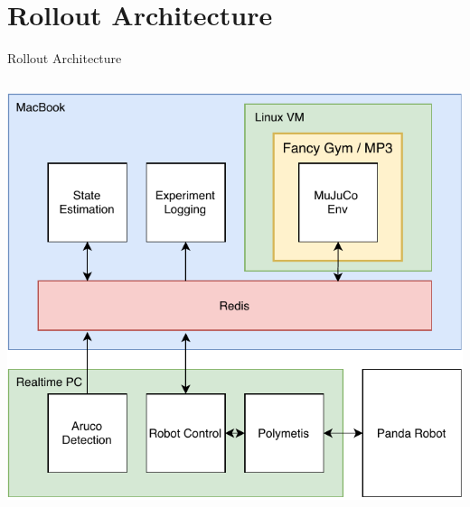 \documentclass[16:9,en,navbarinfooter]{sdqbeamer}
\begin{document}
\section{Rollout Architecture}
\begin{frame}{Rollout Architecture}
	\begin{columns}
		\begin{column}{0.45\textwidth}
			\vspace{1cm}
			\includegraphics[width=\linewidth]{media/Architecture2.pdf}


\end{column}
\end{columns}
\end{frame}
\end{document}
